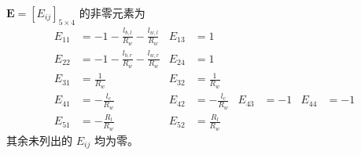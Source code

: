 $\boldsymbol{E}=[E_{ij}]_{5\times4}$ 的非零元素为
\begin{align}
  E_{11} &= -1-\frac{l_{b,l}}{R_w}-\frac{l_{w,l}}{R_w} &
  E_{13} &= 1 \\
  E_{22} &= -1-\frac{l_{b,r}}{R_w}-\frac{l_{w,r}}{R_w} &
  E_{24} &= 1 \\
  E_{31} &= \frac{1}{R_w} &
  E_{32} &= \frac{1}{R_w} \\
  E_{41} &= -\frac{l_c}{R_w} &
  E_{42} &= -\frac{l_c}{R_w} &
  E_{43} &= -1 &
  E_{44} &= -1 \\
  E_{51} &= -\frac{R_l}{R_w} &
  E_{52} &= \frac{R_l}{R_w}
\end{align}
其余未列出的 $E_{ij}$ 均为零。
